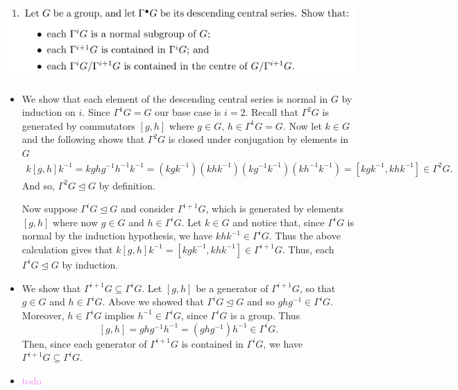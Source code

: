 \documentclass[12pt,letterpaper,boxed]{hmcpset}
\newcommand{\wg}[1]{\textcolor{violet}{#1}}
\newcommand{\inv}{^{-1}}
\newcommand{\normal}{\unlhd} %
\begin{document}


\begin{problem}
	\includegraphics[scale=0.8]{1.png}
	\hfill
\end{problem}

\begin{solution}
\begin{itemize}
\item 
We show that each element of the descending central series is normal
in $G$  by induction on $i$. Since
$\Gamma^1 G = G$ our base case is $i=2$. Recall that $\Gamma^2 G$ is
generated by commutators $[g,h]$ where $g \in G$, $h \in \Gamma^1G =
G$.
Now let $k \in G$
and the following shows that $\Gamma^2 G$ is closed under conjugation
by elements in $G$ 
\begin{align*}
	k [g,h] k\inv = k g h g\inv h\inv k\inv
	= (kgk\inv)(k h k\inv) (k g\inv k\inv) (k h\inv k\inv)
	= [k g k\inv, k h k\inv] \in \Gamma^2 G.
\end{align*}
And so, $\Gamma^2 G \normal G$ by definition.

Now suppose $\Gamma^i G \normal G$ and consider $\Gamma^{i+1} G$,
which is generated by elements $[g,h]$ where now $g \in G$ and $h \in
\Gamma^i G$. Let $k \in G$ and notice that, since $\Gamma^i G$ is
normal by the induction hypothesis, 
we have $k h k\inv \in \Gamma^iG$. Thus the above calculation
gives that $k[g,h]k \inv = [k g k\inv, k h k\inv] \in \Gamma^{i+1}G$.
Thus, each $\Gamma^i G \normal G$ by induction.

\item 
We show that $\Gamma^{i+1} G \subseteq \Gamma^i G$. Let $[g,h]$ be a
generator of $\Gamma^{i+1}G$, so that $g \in G$ and $h \in
\Gamma^{i}G$. 
Above we showed that $\Gamma^i G \normal G$ and so $ghg\inv \in
\Gamma^i G$. Moreover, $h \in \Gamma^i G$ implies $h\inv \in \Gamma^i
G$, since $\Gamma^i G$ is a group. Thus \[
	[g,h] = ghg\inv h\inv = (g h g\inv) h\inv \in \Gamma^i G. 
\]
Then, since each generator of $\Gamma^{i+1} G$ is contained in
$\Gamma^i G$, we have $\Gamma^{i+1} G \subseteq \Gamma^{i}G$. 

\item \wg{todo}
\end{itemize}

\end{solution}
\end{document}
